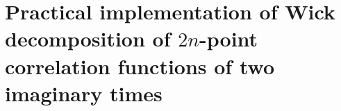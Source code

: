 

\section{Practical implementation of Wick decomposition of $2n$-point correlation functions of two imaginary times } \label{sec:wick}

